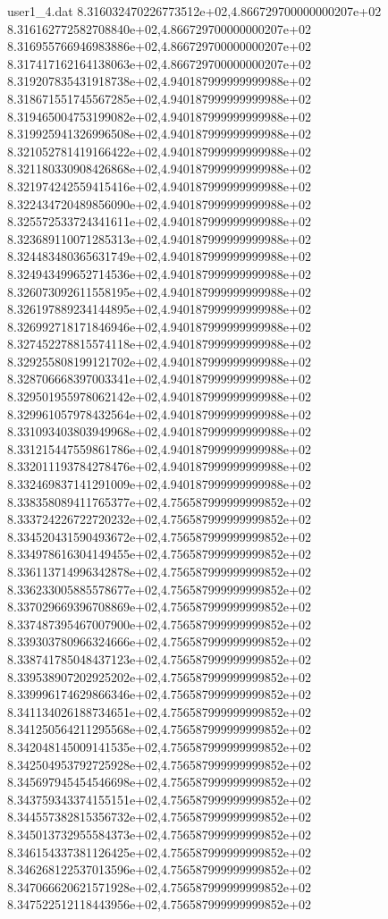 \begin{filecontents}{user1_4.dat}
8.316032470226773512e+02,4.866729700000000207e+02
8.316162772582708840e+02,4.866729700000000207e+02
8.316955766946983886e+02,4.866729700000000207e+02
8.317417162164138063e+02,4.866729700000000207e+02
8.319207835431918738e+02,4.940187999999999988e+02
8.318671551745567285e+02,4.940187999999999988e+02
8.319465004753199082e+02,4.940187999999999988e+02
8.319925941326996508e+02,4.940187999999999988e+02
8.321052781419166422e+02,4.940187999999999988e+02
8.321180330908426868e+02,4.940187999999999988e+02
8.321974242559415416e+02,4.940187999999999988e+02
8.322434720489856090e+02,4.940187999999999988e+02
8.325572533724341611e+02,4.940187999999999988e+02
8.323689110071285313e+02,4.940187999999999988e+02
8.324483480365631749e+02,4.940187999999999988e+02
8.324943499652714536e+02,4.940187999999999988e+02
8.326073092611558195e+02,4.940187999999999988e+02
8.326197889234144895e+02,4.940187999999999988e+02
8.326992718171846946e+02,4.940187999999999988e+02
8.327452278815574118e+02,4.940187999999999988e+02
8.329255808199121702e+02,4.940187999999999988e+02
8.328706668397003341e+02,4.940187999999999988e+02
8.329501955978062142e+02,4.940187999999999988e+02
8.329961057978432564e+02,4.940187999999999988e+02
8.331093403803949968e+02,4.940187999999999988e+02
8.331215447559861786e+02,4.940187999999999988e+02
8.332011193784278476e+02,4.940187999999999988e+02
8.332469837141291009e+02,4.940187999999999988e+02
8.338358089411765377e+02,4.756587999999999852e+02
8.333724226722720232e+02,4.756587999999999852e+02
8.334520431590493672e+02,4.756587999999999852e+02
8.334978616304149455e+02,4.756587999999999852e+02
8.336113714996342878e+02,4.756587999999999852e+02
8.336233005885578677e+02,4.756587999999999852e+02
8.337029669396708869e+02,4.756587999999999852e+02
8.337487395467007900e+02,4.756587999999999852e+02
8.339303780966324666e+02,4.756587999999999852e+02
8.338741785048437123e+02,4.756587999999999852e+02
8.339538907202925202e+02,4.756587999999999852e+02
8.339996174629866346e+02,4.756587999999999852e+02
8.341134026188734651e+02,4.756587999999999852e+02
8.341250564211295568e+02,4.756587999999999852e+02
8.342048145009141535e+02,4.756587999999999852e+02
8.342504953792725928e+02,4.756587999999999852e+02
8.345697945454546698e+02,4.756587999999999852e+02
8.343759343374155151e+02,4.756587999999999852e+02
8.344557382815356732e+02,4.756587999999999852e+02
8.345013732955584373e+02,4.756587999999999852e+02
8.346154337381126425e+02,4.756587999999999852e+02
8.346268122537013596e+02,4.756587999999999852e+02
8.347066620621571928e+02,4.756587999999999852e+02
8.347522512118443956e+02,4.756587999999999852e+02

\end{filecontents}
